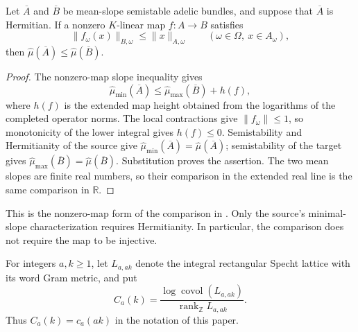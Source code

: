 \begin{lemma}
\label{lem:semistable-contraction-slope}
\leanok
Let $\overline A$ and $\overline B$ be mean-slope semistable adelic bundles,
and suppose that $\overline A$ is Hermitian. If a nonzero $K$-linear map
$f:A\to B$ satisfies
\[
 \|f_\omega(x)\|_{B,\omega}\leq\|x\|_{A,\omega}
 \qquad(\omega\in\Omega,\ x\in A_\omega),
\]
then $\widehat\mu(\overline A)\leq\widehat\mu(\overline B)$.
\end{lemma}
\begin{proof}
The nonzero-map slope inequality gives
\[
 \widehat\mu_{\min}(\overline A)
 \leq\widehat\mu_{\max}(\overline B)+h(f),
\]
where $h(f)$ is the extended map height obtained from the logarithms of the
completed operator norms. The local contractions give $\|f_\omega\|\leq1$,
so monotonicity of the lower integral gives $h(f)\leq0$.
Semistability and Hermitianity of the source give
$\widehat\mu_{\min}(\overline A)=\widehat\mu(\overline A)$;
semistability of the target gives
$\widehat\mu_{\max}(\overline B)=\widehat\mu(\overline B)$.
Substitution proves the assertion. The two mean slopes are finite real
numbers, so their comparison in the extended real line is the same comparison
in $\mathbb R$.
\end{proof}

This is the nonzero-map form of the comparison in
\cite[Proposition 2.4 and the proof of Theorem 6.2]{bost2026}.
Only the source's minimal-slope characterization requires Hermitianity.
In particular, the comparison does not require the map to be injective.

For integers $a,k\geq1$, let $L_{a,ak}$ denote the integral rectangular
Specht lattice with its word Gram metric, and put
\[
 C_a(k)=\frac{\log\operatorname{covol}(L_{a,ak})}
                  {\operatorname{rank}_{\mathbb Z}L_{a,ak}}.
\]
Thus $C_a(k)=c_a(ak)$ in the notation of this paper.

